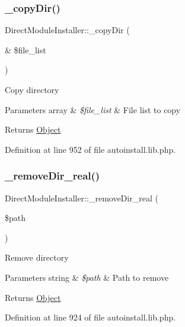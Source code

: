 \subsubsection{\texorpdfstring{\+\_\+copy\+Dir()}{\_copyDir()}}
{\footnotesize\ttfamily Direct\+Module\+Installer\+::\+\_\+copy\+Dir (\begin{DoxyParamCaption}\item[{\&}]{\$file\+\_\+list }\end{DoxyParamCaption})}

Copy directory


\begin{DoxyParams}[1]{Parameters}
array & {\em \$file\+\_\+list} & File list to copy \\
\hline
\end{DoxyParams}
\begin{DoxyReturn}{Returns}
\hyperlink{classObject}{Object} 
\end{DoxyReturn}


Definition at line 952 of file autoinstall.\+lib.\+php.

\mbox{\label{classDirectModuleInstaller_aec81874ceba294e9a63ad515c2a15c87}} 
\subsubsection{\texorpdfstring{\+\_\+remove\+Dir\+\_\+real()}{\_removeDir\_real()}}
{\footnotesize\ttfamily Direct\+Module\+Installer\+::\+\_\+remove\+Dir\+\_\+real (\begin{DoxyParamCaption}\item[{}]{\$path }\end{DoxyParamCaption})}

Remove directory 
\begin{DoxyParams}[1]{Parameters}
string & {\em \$path} & Path to remove \\
\hline
\end{DoxyParams}
\begin{DoxyReturn}{Returns}
\hyperlink{classObject}{Object} 
\end{DoxyReturn}


Definition at line 924 of file autoinstall.\+lib.\+php.


